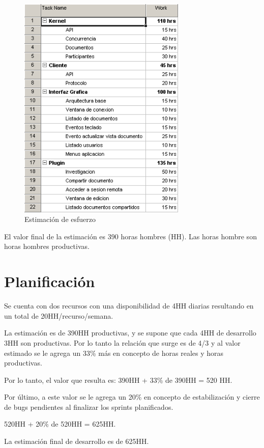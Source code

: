\documentclass[12pt,a4paper]{article}
\begin{document}
	\begin{figure}[!ht]
		\begin{center}
			\includegraphics[width=8cm]{wbs.png}
			\caption{\label{WBS} Estimación de esfuerzo }
		\end{center}
	\end{figure}

	El valor final de la estimación es 390 horas hombres (HH). Las horas hombre son horas hombres productivas.

	\section{Planificación}

	Se cuenta con dos recursos con una disponibilidad de 4HH diarias resultando en un total de 20HH/recurso/semana.

	La estimación es de 390HH productivas, y se supone que cada 4HH de desarrollo 3HH son productivas. Por lo tanto la relación que surge es de 4/3 y al valor estimado se le agrega un 33\% más en concepto de horas reales y horas productivas.

	Por lo tanto, el valor que resulta es: 390HH + 33\% de 390HH = 520 HH.

	Por último, a este valor se le agrega un 20\% en concepto de estabilización y cierre de bugs pendientes al finalizar los sprints planificados.

	520HH + 20\% de 520HH = 625HH.

	La estimación final de desarrollo es de 625HH.
\end{document}
